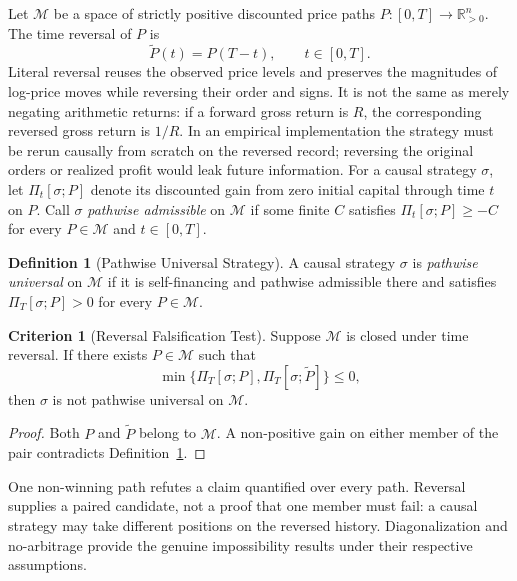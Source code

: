 \documentclass[aps,pra,reprint,superscriptaddress,amsmath,amssymb,floatfix]{revtex4-2}
\theoremstyle{plain}
\theoremstyle{definition}
\newtheorem{definition}{Definition}
\newtheorem{criterion}{Criterion}
\theoremstyle{remark}
\begin{document}
Let \(\mathcal{M}\) be a space of strictly positive discounted price paths
\(P\colon[0,T]\to\mathbb{R}_{>0}^n\). The time reversal of \(P\) is
\begin{equation}
  \widetilde{P}(t)=P(T-t), \qquad t\in[0,T].
  \label{eq:timereversal}
\end{equation}
Literal reversal reuses the observed price levels and preserves the magnitudes
of log-price moves while reversing their order and signs. It is not the same
as merely negating arithmetic returns: if a forward gross return is \(R\), the
corresponding reversed gross return is \(1/R\). In an empirical implementation
the strategy must be rerun causally from scratch on the reversed record;
reversing the original orders or realized profit would leak future information.
For a causal strategy \(\sigma\), let \(\Pi_t[\sigma;P]\) denote its discounted
gain from zero initial capital through time \(t\) on \(P\). Call \(\sigma\)
\emph{pathwise admissible} on \(\mathcal M\) if some finite \(C\) satisfies
\(\Pi_t[\sigma;P]\geq-C\) for every \(P\in\mathcal M\) and
\(t\in[0,T]\).

\begin{definition}[Pathwise Universal Strategy]
\label{def:universal}
  A causal strategy \(\sigma\) is \emph{pathwise universal} on
  \(\mathcal{M}\) if it is self-financing and pathwise admissible there and
  satisfies \(\Pi_T[\sigma;P]>0\) for every \(P\in\mathcal{M}\).
\end{definition}

\begin{criterion}[Reversal Falsification Test]
  \label{crit:tr}
  Suppose \(\mathcal{M}\) is closed under time reversal. If there exists
  \(P\in\mathcal{M}\) such that
  \begin{equation}
    \min\{\Pi_T[\sigma;P],\Pi_T[\sigma;\widetilde P]\}\leq 0,
    \label{eq:reversaltest}
  \end{equation}
  then \(\sigma\) is not pathwise universal on \(\mathcal{M}\).
\end{criterion}

\begin{proof}
Both \(P\) and \(\widetilde P\) belong to \(\mathcal{M}\). A non-positive gain
on either member of the pair contradicts Definition~\ref{def:universal}.
\end{proof}

One non-winning path refutes a claim quantified over every path. Reversal
supplies a paired candidate, not a proof that one member must fail: a causal
strategy may take different positions on the reversed history.
Diagonalization and no-arbitrage provide the genuine impossibility results
under their respective assumptions.
\end{document}
